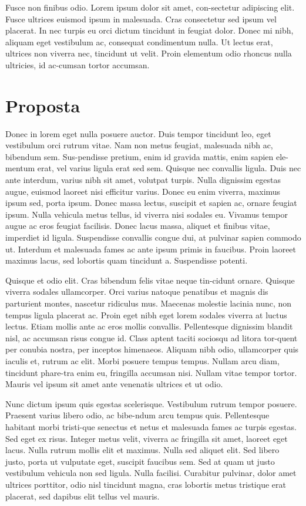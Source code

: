﻿\documentclass[10pt,a4paper,twocolumn,twoside]{article}
\begin{document}
Fusce non finibus odio. Lorem ipsum dolor sit amet, con-sectetur adipiscing elit. Fusce ultrices euismod ipsum in malesuada. Cras consectetur sed ipsum vel placerat. In nec turpis eu orci dictum tincidunt in feugiat dolor. Donec mi nibh, aliquam eget vestibulum ac, consequat condimentum nulla. Ut lectus erat, ultrices non viverra nec, tincidunt ut velit. Proin elementum odio rhoncus nulla ultricies, id ac-cumsan tortor accumsan. 


\section{Proposta}

Donec in lorem eget nulla posuere auctor. Duis tempor tincidunt leo, eget vestibulum orci rutrum vitae. Nam non metus feugiat, malesuada nibh ac, bibendum sem. Sus-pendisse pretium, enim id gravida mattis, enim sapien ele-mentum erat, vel varius ligula erat sed sem. Quisque nec convallis ligula. Duis nec ante interdum, varius nibh sit amet, volutpat turpis. Nulla dignissim egestas augue, euismod laoreet nisi efficitur varius. Donec eu enim viverra, maximus ipsum sed, porta ipsum. Donec massa lectus, suscipit et sapien ac, ornare feugiat ipsum. Nulla vehicula metus tellus, id viverra nisi sodales eu. Vivamus tempor augue ac eros feugiat facilisis. Donec lacus massa, aliquet et finibus vitae, imperdiet id ligula. Suspendisse convallis congue dui, at pulvinar sapien commodo ut. Interdum et malesuada fames ac ante ipsum primis in faucibus. Proin laoreet maximus lacus, sed lobortis quam tincidunt a. Suspendisse potenti. 

Quisque et odio elit. Cras bibendum felis vitae neque tin-cidunt ornare. Quisque viverra sodales ullamcorper. Orci varius natoque penatibus et magnis dis parturient montes, nascetur ridiculus mus. Maecenas molestie lacinia nunc, non tempus ligula placerat ac. Proin eget nibh eget lorem sodales viverra at luctus lectus. Etiam mollis ante ac eros mollis convallis. Pellentesque dignissim blandit nisl, ac accumsan risus congue id. Class aptent taciti sociosqu ad litora tor-quent per conubia nostra, per inceptos himenaeos. Aliquam nibh odio, ullamcorper quis iaculis et, rutrum ac elit. Morbi posuere tempus tempus. Nullam arcu diam, tincidunt phare-tra enim eu, fringilla accumsan nisi. Nullam vitae tempor tortor. Mauris vel ipsum sit amet ante venenatis ultrices et ut odio. 

Nunc dictum ipsum quis egestas scelerisque. Vestibulum rutrum tempor posuere. Praesent varius libero odio, ac bibe-ndum arcu tempus quis. Pellentesque habitant morbi tristi-que senectus et netus et malesuada fames ac turpis egestas. Sed eget ex risus. Integer metus velit, viverra ac fringilla sit amet, laoreet eget lacus. Nulla rutrum mollis elit et maximus. Nulla sed aliquet elit. Sed libero justo, porta ut vulputate eget, suscipit faucibus sem. Sed at quam ut justo vestibulum vehicula non sed ligula. Nulla facilisi. Curabitur pulvinar, dolor amet ultrices porttitor, odio nisl tincidunt magna, cras lobortis metus tristique erat placerat, sed dapibus elit tellus vel mauris.
\end{document}
